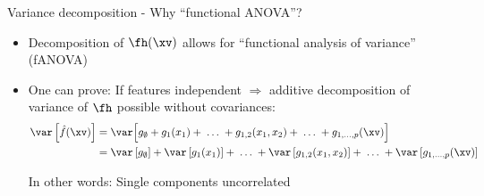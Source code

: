 \documentclass[11pt,compress,t,notes=noshow, aspectratio=169, xcolor=table]{beamer}
\newcommand{\open}{}
\newcommand{\close}{}
\begin{document}
\begin{frame}{Variance decomposition - Why ``functional ANOVA''?
}

\begin{itemize}[<+->]
\item Decomposition of $\fh(\xv)$ allows for ``functional analysis of variance'' (fANOVA)
\item One can prove: 
If features independent $\Rightarrow$ additive decomposition of variance of $\fh$ possible without covariances:
\begin{align*}
\var\left[\hat{f}(\xv)\right]
&=  \var \Big[g_{\open \emptyset \close} + g_{\open 1 \close}(x_1) + \;\dots\; + g_{\open 1, 2 \close}(x_1, x_2) + \;\dots\; + g_{\open 1,\ldots,p \close}(\xv) \Big] \\
&= \var\left[g_{\open \emptyset \close}\right] + \var\left[g_{\open 1 \close}(x_1)\right] + \;\dots\; + \var\left[g_{\open 1, 2 \close}(x_1, x_2)\right] + \;\dots\; + \var\left[g_{\open 1,\ldots,p \close}(\xv)\right]
\end{align*}

In other words: Single components uncorrelated


\end{itemize}
\end{frame}
\end{document}
